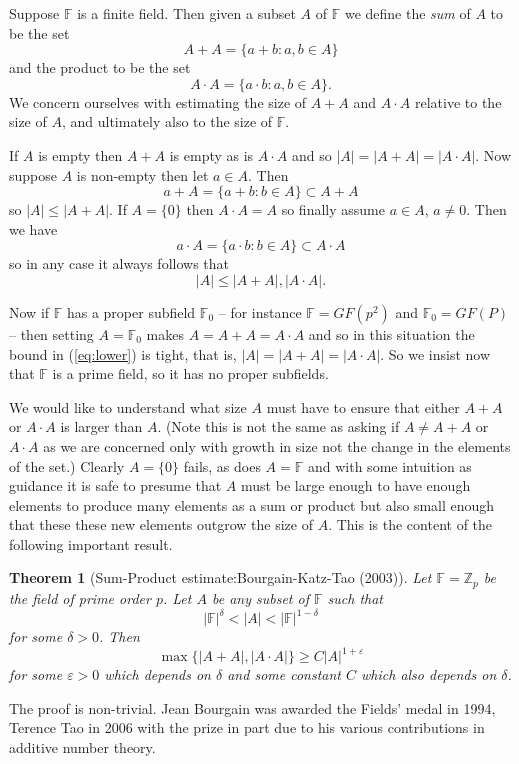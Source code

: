 \documentclass[12pt]{article}
\newtheorem{thm}{Theorem}
\begin{document}
Suppose $\mathbb{F}$ is a finite field.  Then given a subset $A$ of $\mathbb{F}$
we define the \emph{sum} of $A$ to be the set
   \[A+A=\{a+b:a,b\in A\}\]
and the product to be the set
   \[A\cdot A=\{a\cdot b:a,b\in A\}.\]
We concern ourselves with estimating the size of $A+A$ and $A\cdot A$ relative to the size of $A$, and ultimately also to the size of $\mathbb{F}$.

If $A$ is empty then $A+A$ is empty as is $A\cdot A$ and so 
$|A|=|A+A|=|A\cdot A|$.  Now suppose $A$ is non-empty then let $a\in A$.
Then
   \[a+A=\{a+b:b\in A\}\subset A+A\]
so $|A|\leq |A+A|$.  If $A=\{0\}$ then $A\cdot A=A$ so finally assume
$a\in A$, $a\neq 0$.  Then we have
   \[a\cdot A=\{a\cdot b:b\in A\}\subset A\cdot A\]
so in any case it always follows that 
\begin{equation}\label{eq:lower}
   |A|\leq |A+A|, |A\cdot A|.
\end{equation}

Now if $\mathbb{F}$ has a proper subfield $\mathbb{F}_0$ -- for instance
$\mathbb{F}=GF(p^2)$ and $\mathbb{F}_0=GF(P)$ -- then setting $A=\mathbb{F}_0$
makes $A=A+A=A\cdot A$ and so in this situation the bound in (\ref{eq:lower})
is tight, that is, $|A|=|A+A|=|A\cdot A|$.   So we insist now that $\mathbb{F}$
is a prime field, so it has no proper subfields.

We would like to understand what size $A$ must have to ensure that either
$A+A$ or $A\cdot A$ is larger than $A$.  (Note this is not the same as asking
if $A\neq A+A$ or $A\cdot A$ as we are concerned only with growth in size not the change in the elements of the set.)  Clearly $A=\{0\}$ fails, as does
$A=\mathbb{F}$ and with some intuition as guidance it is safe to presume that
$A$ must be large enough to have enough elements to produce many elements as a sum or product but also small enough that these these new elements outgrow
the size of $A$.  This is the content of the following important result.

\begin{thm}[Sum-Product estimate:Bourgain-Katz-Tao (2003)]
Let $\mathbb{F}=\mathbb{Z}_p$ be the field of prime order $p$.  Let $A$
be any subset of $\mathbb{F}$ such that
    \[|\mathbb{F}|^{\delta} < |A| < |\mathbb{F}|^{1-\delta}\]
for some $\delta>0$.  Then 
    \[\max\{|A+A|,|A\cdot A|\}\geq C |A|^{1+\varepsilon}\]
for some $\varepsilon>0$ which depends on $\delta$ and some constant
$C$ which also depends on $\delta$.
\end{thm}

The proof is non-trivial.  Jean Bourgain was awarded the Fields' medal in 1994,
Terence Tao in 2006 with the prize in part due to his various contributions in additive number theory.
\\
\\

\end{document}
